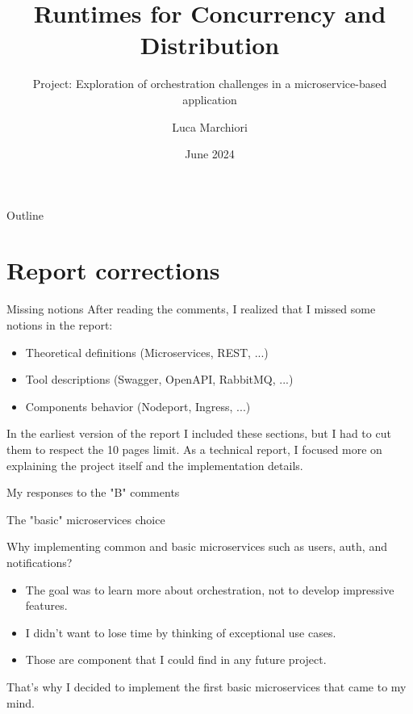 \documentclass{beamer}
\title{Runtimes for Concurrency and Distribution}
\subtitle{Project: Exploration of orchestration challenges in a microservice-based application}
\author{Luca Marchiori}
\date{June 2024}
\begin{document}
\maketitle

\begin{frame}{Outline}
	\tableofcontents
\end{frame}


\section{Report corrections}


\begin{frame}{Missing notions}
	After reading the comments, I realized that I missed some notions in the report:
	\begin{itemize}
		\item Theoretical definitions (Microservices, REST, ...)
		\item Tool descriptions (Swagger, OpenAPI, RabbitMQ, ...)
		\item Components behavior (Nodeport, Ingress, ...)
	\end{itemize}
		
	In the earliest version of the report I included these sections, but I had to cut them to respect the 10 pages limit.
	\newline
	\newline
	As a technical report, I focused more on explaining the project itself and the implementation details.
\end{frame}


\begin{frame}
	\begin{center}
		\huge{My responses to the "B" comments}
	\end{center}
\end{frame}

\begin{frame}{The "basic" microservices choice}
	\label{common_ms}
	\begin{block}{}
		Why implementing common and basic microservices such as users, auth, and notifications?
	\end{block}
	\begin{itemize}
		\item The goal was to learn more about orchestration, not to develop impressive features.
		\item I didn't want to lose time by thinking of exceptional use cases.
		\item Those are component that I could find in any future project.
	\end{itemize}
	That's why I decided to implement the first basic microservices that came to my mind. 
\end{frame}
\end{document}

